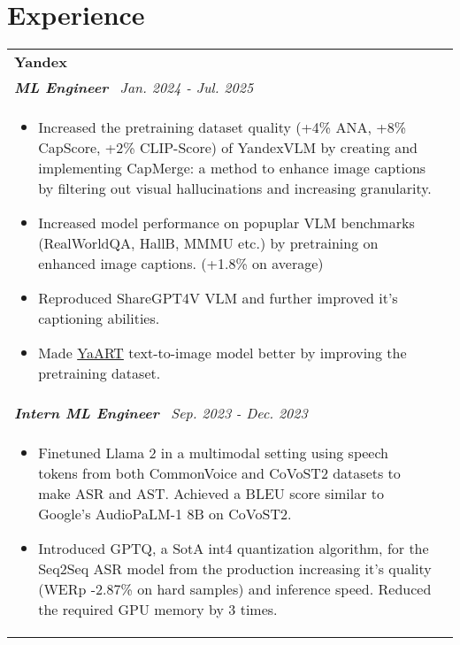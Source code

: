 \documentclass[a4paper,8pt]{article}
\begin{document}
\section{Experience}
\begin{tabularx}{\linewidth}{ @{}l r@{} }
\textbf{Yandex} \\[4pt]
\color[HTML]{371e77}\textbf{\textit{ML Engineer}}\ \hfill \color[HTML]{4B28A4} \textit{Jan. 2024 - Jul. 2025} \\[5pt]
\begin{minipage}[t]{\linewidth}
    \begin{itemize}[nosep,after=\strut, leftmargin=2em, itemsep=2pt]
        \item Increased the pretraining dataset quality (+4\% ANA, +8\% CapScore, +2\% CLIP-Score) of YandexVLM by creating and implementing CapMerge: a method to enhance image captions by filtering out visual hallucinations and increasing granularity.
        \item Increased model performance on popuplar VLM benchmarks (RealWorldQA, HallB, MMMU etc.) by pretraining on enhanced image captions. (+1.8\% on average)
        \item Reproduced ShareGPT4V VLM and further improved it's captioning abilities.
        \item Made \href{https://ya.ru/ai/art/paper-yaart-v1}{YaART} text-to-image model better by improving the pretraining dataset.
    \end{itemize}
\end{minipage} \\

\color[HTML]{371e77}\textbf{\textit{Intern ML Engineer}}\ \hfill \color[HTML]{4B28A4} \textit{Sep. 2023 - Dec. 2023} \\[5pt]
\begin{minipage}[t]{\linewidth}
    \begin{itemize}[nosep,after=\strut, leftmargin=2em, itemsep=2pt]
        \item Finetuned Llama 2 in a multimodal setting using speech tokens from both CommonVoice and CoVoST2 datasets to make ASR and AST. Achieved a BLEU score similar to Google's AudioPaLM-1 8B on CoVoST2.
        \item Introduced GPTQ, a SotA int4 quantization algorithm, for the Seq2Seq ASR model from the production increasing it’s quality (WERp -2.87\% on hard samples) and inference speed. Reduced the required GPU memory by 3 times.
    \end{itemize}
\end{minipage}
\end{tabularx}
\end{document}
